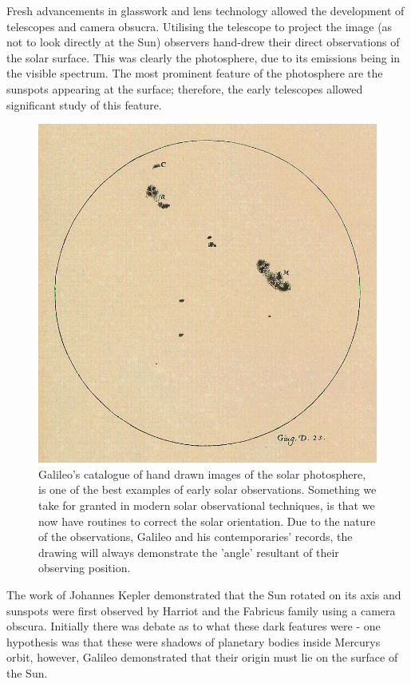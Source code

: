 Fresh advancements in glasswork and lens technology allowed the development of telescopes and camera obsucra.
Utilising the telescope to project the image (as not to look directly at the Sun) observers hand-drew their direct observations of the solar surface.
This was clearly the photosphere, due to its emissions being in the visible spectrum. 
The most prominent feature of the photosphere are the sunspots appearing at the surface; therefore, the early telescopes allowed significant study of this feature.

\begin{figure}
	\includegraphics[width=\linewidth]{Chapter1/Figs/galileosunspot}
	\caption{Galileo's catalogue of hand drawn images of the solar photosphere, is one of the best examples of early solar observations. 
			Something we take for granted in modern solar observational techniques, is that we now have routines to correct the solar orientation.
			Due to the nature of the observations, Galileo and his contemporaries' records, the drawing will always demonstrate the 'angle' resultant of their observing position.}
	\label{fig:gali_sp}
\end{figure}

The work of Johannes Kepler demonstrated that the Sun rotated on its axis and sunspots were first observed by Harriot and the Fabricus family using a camera obscura. 
Initially there was debate as to what these dark features were - one hypothesis was that these were shadows of planetary bodies inside Mercurys orbit, however, Galileo demonstrated that their origin must lie on the surface of the Sun.

